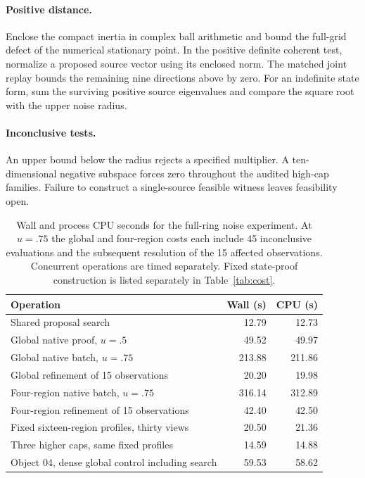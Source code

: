 \documentclass[anonymous,12pt]{iopjournal}
\theoremstyle{remark}\newtheorem{remark}[theorem]{Remark}
\numberwithin{equation}{section}
\begin{document}
\paragraph{Positive distance.}
Enclose the compact inertia in complex ball arithmetic \cite{arb} and bound the full-grid defect of the numerical stationary point. In the positive definite coherent test, normalize a proposed source vector using its enclosed norm. The matched joint replay bounds the remaining nine directions above by zero. For an indefinite state form, sum the surviving positive source eigenvalues and compare the square root with the upper noise radius.

\paragraph{Inconclusive tests.}
An upper bound below the radius rejects a specified multiplier. A ten-dimensional negative subspace forces zero throughout the audited high-cap families. Failure to construct a single-source feasible witness leaves feasibility open.

\begin{table}[tb]
\caption{Wall and process CPU seconds for the full-ring noise experiment. At $u=.75$ the global and four-region costs each include 45 inconclusive evaluations and the subsequent resolution of the 15 affected observations. Concurrent operations are timed separately. Fixed state-proof construction is listed separately in Table~\ref{tab:cost}.}\label{tab:replay}
\centering\begin{tabular}{lrr}\toprule
Operation & Wall (s) & CPU (s)\\ \midrule
Shared proposal search &12.79&12.73\\
Global native proof, $u=.5$ &49.52&49.97\\
Global native batch, $u=.75$ &213.88&211.86\\
Global refinement of 15 observations &20.20&19.98\\
Four-region native batch, $u=.75$ &316.14&312.89\\
Four-region refinement of 15 observations &42.40&42.50\\
Fixed sixteen-region profiles, thirty views &20.50&21.36\\
Three higher caps, same fixed profiles &14.59&14.88\\
Object 04, dense global control including search &59.53&58.62\\ \bottomrule
\end{tabular}
\end{table}
\end{document}
